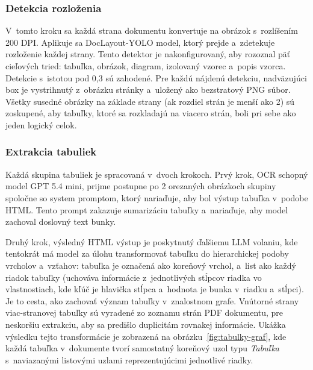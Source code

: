 \subsubsection{Detekcia rozloženia}
V~tomto kroku sa každá strana dokumentu konvertuje na obrázok s~rozlíšením 200 DPI. Aplikuje sa DocLayout-YOLO model, ktorý prejde a~zdetekuje rozloženie každej strany. Tento detektor je nakonfigurovaný, aby rozoznal päť cieľových tried: tabuľka, obrázok, diagram, izolovaný vzorec a~popis vzorca. Detekcie s~istotou pod 0,3 sú zahodené. Pre každú nájdenú detekciu, nadväzujúci box je vystrihnutý z~obrázku stránky a~uložený ako bezstratový PNG súbor. Všetky susedné obrázky na základe strany (ak rozdiel strán je menší ako 2) sú zoskupené, aby tabuľky, ktoré sa rozkladajú na viacero strán, boli pri sebe ako jeden logický celok.

\subsubsection{Extrakcia tabuliek}
Každá skupina tabuliek je spracovaná v~dvoch krokoch. Prvý krok, OCR schopný model GPT 5.4 mini, prijme postupne po 2 orezaných obrázkoch skupiny spoločne so system promptom, ktorý nariaďuje, aby bol výstup tabuľka v~podobe HTML. Tento prompt zakazuje sumarizáciu tabuľky a~nariaďuje, aby model zachoval doslovný text bunky.

Druhý krok, výsledný HTML výstup je poskytnutý ďalšiemu LLM volaniu, kde tentokrát má model za úlohu transformovať tabuľku do hierarchickej podoby vrcholov a~vzťahov: tabuľka je označená ako koreňový vrchol, a~list ako každý riadok tabuľky (uchováva informácie z~jednotlivých stĺpcov riadka vo vlastnostiach, kde kľúč je hlavička stĺpca a~hodnota je bunka v~riadku a~stĺpci). Je to cesta, ako zachovať význam tabuľky v~znalostnom grafe. Vnútorné strany viac-stranovej tabuľky sú vyradené zo zoznamu strán PDF dokumentu, pre neskoršiu extrakciu, aby sa predišlo duplicitám rovnakej informácie. Ukážka výsledku tejto transformácie je zobrazená na obrázku~\ref{fig:tabulky-graf}, kde každá tabuľka v~dokumente tvorí samostatný koreňový uzol typu \emph{Tabuľka} s~naviazanými listovými uzlami reprezentujúcimi jednotlivé riadky.

